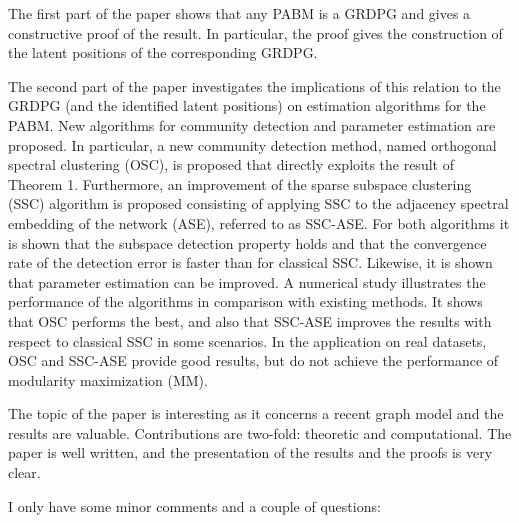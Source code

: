 \documentclass[
]{article}
\begin{document}
The first part of the paper shows that any PABM is a GRDPG and gives a
constructive proof of the result. In particular, the proof gives the
construction of the latent positions of the corresponding GRDPG.

The second part of the paper investigates the implications of this
relation to the GRDPG (and the identified latent positions) on
estimation algorithms for the PABM. New algorithms for community
detection and parameter estimation are proposed. In particular, a new
community detection method, named orthogonal spectral clustering (OSC),
is proposed that directly exploits the result of Theorem 1. Furthermore,
an improvement of the sparse subspace clustering (SSC) algorithm is
proposed consisting of applying SSC to the adjacency spectral embedding
of the network (ASE), referred to as SSC-ASE. For both algorithms it is
shown that the subspace detection property holds and that the
convergence rate of the detection error is faster than for classical
SSC. Likewise, it is shown that parameter estimation can be improved. A
numerical study illustrates the performance of the algorithms in
comparison with existing methods. It shows that OSC performs the best,
and also that SSC-ASE improves the results with respect to classical SSC
in some scenarios. In the application on real datasets, OSC and SSC-ASE
provide good results, but do not achieve the performance of modularity
maximization (MM).

The topic of the paper is interesting as it concerns a recent graph
model and the results are valuable. Contributions are two-fold:
theoretic and computational. The paper is well written, and the
presentation of the results and the proofs is very clear.

I only have some minor comments and a couple of questions:
\end{document}
